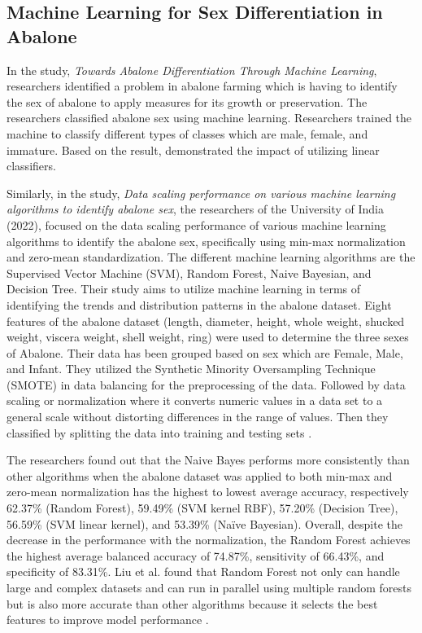 \subsection{Machine Learning for Sex Differentiation in Abalone}
In the study, \textit{Towards Abalone Differentiation Through Machine Learning}, researchers identified a problem in abalone farming which is having to identify the sex of abalone to apply measures for its growth or preservation. The researchers classified abalone sex using machine learning. Researchers trained the machine to classify different types of classes which are male, female, and immature. Based on the result, demonstrated the impact of utilizing linear classifiers. 

Similarly, in the study, \textit{Data scaling performance on various machine learning algorithms to identify abalone sex}, the researchers of the University of India (2022), focused on the data scaling performance of various machine learning algorithms to identify the abalone sex, specifically using min-max normalization and zero-mean standardization. The different machine learning algorithms are the Supervised Vector Machine (SVM), Random Forest, Naive Bayesian, and Decision Tree. Their study aims to utilize machine learning in terms of identifying the trends and distribution patterns in the abalone dataset. Eight features of the abalone dataset (length, diameter, height, whole weight, shucked weight, viscera weight, shell weight, ring) were used to determine the three sexes of Abalone. Their data has been grouped based on sex which are Female, Male, and Infant. They utilized the Synthetic Minority Oversampling Technique (SMOTE) in data balancing for the preprocessing of the data. Followed by data scaling or normalization where it converts numeric values in a data set to a general scale without distorting differences in the range of values. Then they classified by splitting the data into training and testing sets \cite{arifin2021}. 

The researchers found out that the Naive Bayes performs more consistently than other algorithms when the abalone dataset was applied to both min-max and zero-mean normalization has the highest to lowest average accuracy, respectively 62.37\% (Random Forest), 59.49\% (SVM kernel RBF), 57.20\% (Decision Tree), 56.59\% (SVM linear kernel), and 53.39\% (Naïve Bayesian). Overall, despite the decrease in the performance with the normalization, the Random Forest achieves the highest average balanced accuracy of 74.87\%, sensitivity of 66.43\%, and specificity of 83.31\%. Liu et al. found that Random Forest not only can handle large and complex datasets and can run in parallel using multiple random forests but is also more accurate than other algorithms because it selects the best features to improve model performance \cite{arifin2021}. 

